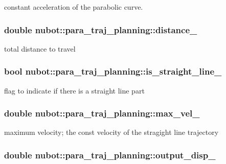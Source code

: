 constant acceleration of the parabolic curve. 

\hypertarget{group__nubot_ga6115be17c446c1a2437b5575baf3f5a8}{
\subsubsection[{distance\-\_\-}]{\setlength{\rightskip}{0pt plus 5cm}double nubot\-::para\-\_\-traj\-\_\-planning\-::distance\-\_\-\hspace{0.3cm}{\ttfamily [private]}}}\label{group__nubot_ga6115be17c446c1a2437b5575baf3f5a8}


total distance to travel 

\hypertarget{group__nubot_ga84667362f94667e70f1cf67829645a7d}{
\subsubsection[{is\-\_\-straight\-\_\-line\-\_\-}]{\setlength{\rightskip}{0pt plus 5cm}bool nubot\-::para\-\_\-traj\-\_\-planning\-::is\-\_\-straight\-\_\-line\-\_\-\hspace{0.3cm}{\ttfamily [private]}}}\label{group__nubot_ga84667362f94667e70f1cf67829645a7d}


flag to indicate if there is a straight line part 

\hypertarget{group__nubot_ga1ae8b889bdbb7716e9fbb5821328e4d1}{
\subsubsection[{max\-\_\-vel\-\_\-}]{\setlength{\rightskip}{0pt plus 5cm}double nubot\-::para\-\_\-traj\-\_\-planning\-::max\-\_\-vel\-\_\-\hspace{0.3cm}{\ttfamily [private]}}}\label{group__nubot_ga1ae8b889bdbb7716e9fbb5821328e4d1}


maximum velocity; the const velocity of the stragight line trajectory 

\hypertarget{group__nubot_ga9095bac66ff724f1b9b9c366546f2b36}{
\subsubsection[{output\-\_\-disp\-\_\-}]{\setlength{\rightskip}{0pt plus 5cm}double nubot\-::para\-\_\-traj\-\_\-planning\-::output\-\_\-disp\-\_\-\hspace{0.3cm}{\ttfamily [private]}}}\label{group__nubot_ga9095bac66ff724f1b9b9c366546f2b36}


